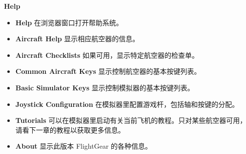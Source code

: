 \ifchinese
 \item \textbf{Help}
\begin{itemize}
 \item \textbf{Help} 在浏览器窗口打开帮助系统。
 \item \textbf{Aircraft Help} 显示相应航空器的信息。
 \item \textbf{Aircraft Checklists} 如果可用，显示特定航空器的检查单。
 \item \textbf{Common Aircraft Keys} 显示控制航空器的基本按键列表。
 \item \textbf{Basic Simulator Keys} 显示控制模拟器的基本按键列表。
 \item \textbf{Joystick Configuration} 在模拟器里配置游戏杆，包括轴和按键的分配。
 \item \textbf{Tutorials} 可以在模拟器里启动有关当前飞机的教程。只对某些航空器可用，请看下一章的教程以获取更多信息。
 \item \textbf{About} 显示此版本 FlightGear 的各种信息。
\end{itemize}
\fi

